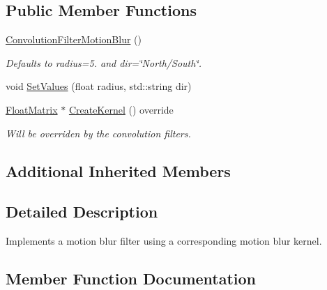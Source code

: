 \subsection*{Public Member Functions}
\begin{DoxyCompactItemize}
\item 
\mbox{\label{classimage__tools_1_1ConvolutionFilterMotionBlur_aca448e3ff4e2518444cab5a4e897a94d}} 
\hyperlink{classimage__tools_1_1ConvolutionFilterMotionBlur_aca448e3ff4e2518444cab5a4e897a94d}{Convolution\+Filter\+Motion\+Blur} ()
\begin{DoxyCompactList}\small\item\em Defaults to radius=5. and dir=\char`\"{}\+North/\+South\char`\"{}. \end{DoxyCompactList}\item 
void \hyperlink{classimage__tools_1_1ConvolutionFilterMotionBlur_afceed9724dbe3579f3affe5c2eff8b0d}{Set\+Values} (float radius, std\+::string dir)
\item 
\mbox{\label{classimage__tools_1_1ConvolutionFilterMotionBlur_a745b24f809059b933c1c01322fa01217}} 
\hyperlink{classimage__tools_1_1FloatMatrix}{Float\+Matrix} $\ast$ \hyperlink{classimage__tools_1_1ConvolutionFilterMotionBlur_a745b24f809059b933c1c01322fa01217}{Create\+Kernel} () override
\begin{DoxyCompactList}\small\item\em Will be overriden by the convolution filters. \end{DoxyCompactList}\end{DoxyCompactItemize}
\subsection*{Additional Inherited Members}


\subsection{Detailed Description}
Implements a motion blur filter using a corresponding motion blur kernel. 

\subsection{Member Function Documentation}
\mbox{\label{classimage__tools_1_1ConvolutionFilterMotionBlur_afceed9724dbe3579f3affe5c2eff8b0d}} 
